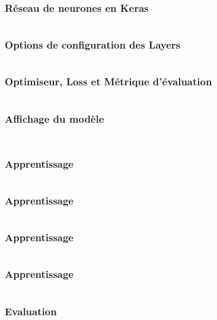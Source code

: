 \begin{frame}
  \frametitle{Réseau de neurones en Keras}
  \inputminted[linenos,fontsize=\small,bgcolor=pythonbg]{python}{code-illustration/tf-keras-mlp.py}
\end{frame}

\begin{frame}
  \frametitle{Options de configuration des Layers}
  \inputminted[linenos,fontsize=\small,bgcolor=pythonbg]{python}{code-illustration/tf-keras-configurelayer.py}
\end{frame}

\begin{frame}
  \frametitle{Optimiseur, Loss et Métrique d'évaluation}
  \inputminted[linenos,fontsize=\small,bgcolor=pythonbg]{python}{code-illustration/tf-keras-compile.py}
\end{frame}

\begin{frame}
  \frametitle{Affichage du modèle}
  \inputminted[linenos,fontsize=\small,bgcolor=pythonbg]{python}{code-illustration/tf-keras-print-model.py}
  \inputminted[linenos,fontsize=\small,bgcolor=returnbg]{python}{code-illustration/tf-keras-print-model.txt}
\end{frame}

\begin{frame}
  \frametitle{Apprentissage}
  \inputminted[linenos,fontsize=\small,bgcolor=pythonbg]{python}{code-illustration/tf-keras-learn-1.py}
\end{frame}

\begin{frame}
  \frametitle{Apprentissage}
  \inputminted[linenos,fontsize=\small,bgcolor=pythonbg]{python}{code-illustration/tf-keras-learn-2.py}
\end{frame}

\begin{frame}
  \frametitle{Apprentissage}
  \inputminted[linenos,fontsize=\small,bgcolor=pythonbg]{python}{code-illustration/tf-keras-learn-3.py}
\end{frame}

\begin{frame}
  \frametitle{Apprentissage}
  \inputminted[linenos,fontsize=\small,bgcolor=pythonbg]{python}{code-illustration/tf-keras-learn-4.py}
\end{frame}

\begin{frame}
  \frametitle{Evaluation}
  \inputminted[linenos,fontsize=\small,bgcolor=pythonbg]{python}{code-illustration/tf-keras-evaluate.py}
  \inputminted[linenos,fontsize=\small,bgcolor=returnbg]{text}{code-illustration/tf-keras-evaluate.txt}
\end{frame}

